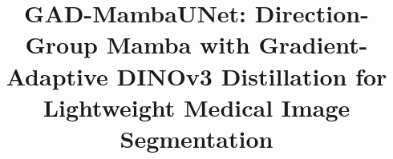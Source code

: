 \documentclass[conference]{IEEEtran}
\begin{document}
\title{GAD-MambaUNet: Direction-Group Mamba with Gradient-Adaptive DINOv3 Distillation for Lightweight Medical Image Segmentation}

\author{
}

\maketitle

\end{document}
